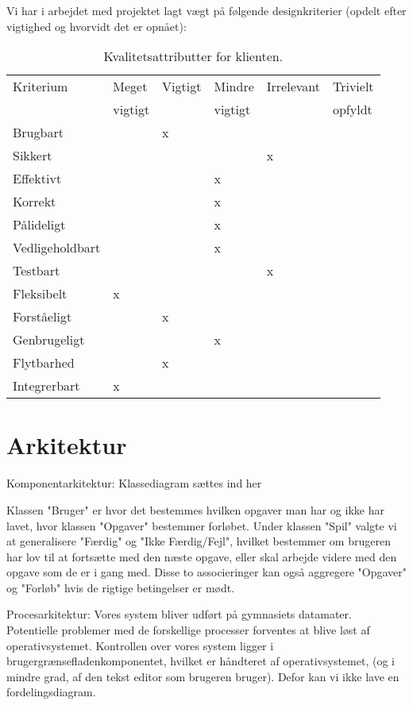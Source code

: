 \documentclass[10pt,a4paper,danish]{article}
\begin{document}
Vi har i arbejdet med projektet lagt vægt på følgende designkriterier (opdelt efter vigtighed og
hvorvidt det er opnået): 
\begin{table}[h!]
  \begin{center}
    \begin{tabular}{llllll}
      \toprule
      Kriterium & Meget   & Vigtigt & Mindre  & Irrelevant & Trivielt \\
                & vigtigt &         & vigtigt &            & opfyldt  \\
      \midrule
      Brugbart        & &x& & & \\
      Sikkert         & & & &x& \\
      Effektivt       & & &x& & \\
      Korrekt         & & &x& & \\
      Pålideligt      & & &x& & \\
      Vedligeholdbart & & &x& & \\
      Testbart        & & & &x& \\
      Fleksibelt      &x& & & & \\
      Forståeligt     & &x& & & \\
      Genbrugeligt    & & &x& & \\
      Flytbarhed      & &x& & & \\
      Integrerbart    &x& & & & \\
      \bottomrule
    \end{tabular}
    \caption{Kvalitetsattributter for klienten.}
    \label{tab:kvalitetsattributter_program}
  \end{center}
\end{table}

\section{Arkitektur}

Komponentarkitektur: {Klassediagram sættes ind her}

Klassen "Bruger" er hvor det bestemmes hvilken opgaver man har og ikke har
lavet, hvor klassen "Opgaver" bestemmer forløbet. Under klassen "Spil" valgte 
vi at generalisere "Færdig" og "Ikke Færdig/Fejl", hvilket bestemmer om brugeren 
har lov til at fortsætte med den næste opgave, eller skal arbejde videre med den 
opgave som de er i gang med. Disse to associeringer kan også aggregere "Opgaver" og 
"Forløb" hvis de rigtige betingelser er mødt.

Procesarkitektur: Vores system bliver udført på gymnasiets datamater. Potentielle 
problemer med de forskellige processer forventes at blive løst af operativsystemet. 
Kontrollen over vores system ligger i brugergrænsefladenkomponentet, hvilket er 
håndteret af operativsystemet, (og i mindre grad, af den tekst editor som brugeren 
bruger). Defor kan vi ikke lave en fordelingsdiagram.
\end{document}
